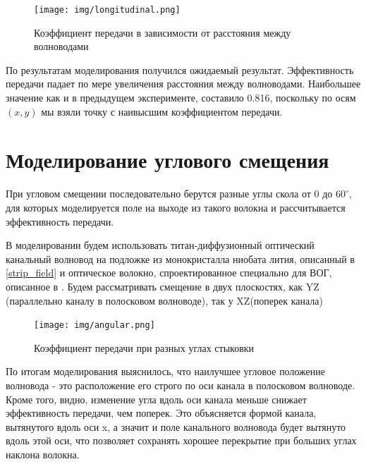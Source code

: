 \begin{figure}[h!]
	\texttt{[image: img/longitudinal.png]}
	\caption{Коэффициент передачи в зависимости от расстояния между волноводами}
	\label{longitudinal}
\end{figure}

По результатам моделирования получился ожидаемый результат. Эффективность передачи падает по мере увеличения расстояния между волноводами. Наибольшее значение как и в предыдущем эксперименте, составило 0.816, поскольку по осям $(x,y)$ мы взяли точку с наивысшим коэффициентом передачи.   

\section{Моделирование углового смещения}

При угловом смещении последовательно берутся разные углы скола от 0 до $60^\circ$, для которых моделируется поле на выходе из такого волокна и рассчитывается эффективность передачи. 

В моделировании будем использовать титан-диффузионный оптический канальный волновод на подложке из монокристалла ниобата лития, описанный в \ref{strip_field} и оптическое волокно, спроектированное специально для ВОГ, описанное в \label{cylinder_field}. Будем рассматривать смещение в двух плоскостях, как YZ (параллельно каналу в полосковом волноводе), так у XZ(поперек канала)

\begin{figure}[h!]
	\texttt{[image: img/angular.png]}
	\caption{Коэффициент передачи при разных углах стыковки}
	\label{angualar}
\end{figure}

По итогам моделирования выяснилось, что наилучшее угловое положение волновода - это расположение его строго по оси канала в полосковом волноводе. Кроме того, видно, изменение угла вдоль оси канала меньше снижает эффективность передачи, чем поперек. Это объясняется формой канала, вытянутого вдоль оси x, а значит и поле канального волновода будет вытянуто вдоль этой оси, что позволяет сохранять хорошее перекрытие при больших углах наклона волокна.
